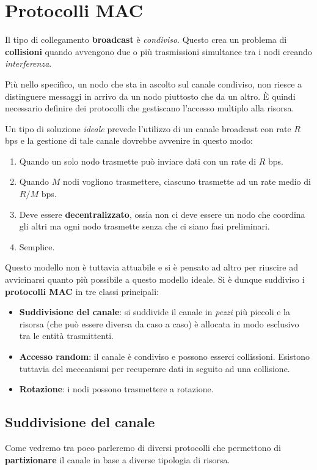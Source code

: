 \section{Protocolli MAC}
Il tipo di collegamento \textbf{broadcast} è \emph{condiviso}. Questo
crea un problema di \textbf{collisioni} quando avvengono due o più 
trasmissioni simultanee tra i nodi creando \emph{interferenza}.

Più nello specifico, un nodo che sta in ascolto sul canale condiviso,
non riesce a distinguere messaggi in arrivo da un nodo piuttosto che
da un altro. \`E quindi necessario definire dei protocolli che 
gestiscano l'accesso multiplo alla risorsa.

Un tipo di soluzione \emph{ideale} prevede l'utilizzo di un canale 
broadcast con rate $R$ bps e la gestione di tale canale dovrebbe 
avvenire in questo modo:
\begin{enumerate}
	\item Quando un solo nodo trasmette può inviare dati con un rate 
		di $R$ bps.
	\item Quando $M$ nodi vogliono trasmettere, ciascuno trasmette ad
		un rate medio di $R / M$ bps.
	\item Deve essere \textbf{decentralizzato}, ossia non ci deve
		essere un nodo che coordina gli altri ma ogni nodo trasmette
		senza che ci siano fasi preliminari.
	\item Semplice.
\end{enumerate}
Questo modello non è tuttavia attuabile e si è pensato ad altro per
riuscire ad avvicinarsi quanto più possibile a questo modello ideale.
Si è dunque suddiviso i \textbf{protocolli MAC} in tre classi 
principali:
\begin{itemize}
	\item \textbf{Suddivisione del canale}: si suddivide il canale
		in \emph{pezzi} più piccoli e la risorsa (che può essere 
		diversa da caso a caso) è allocata in modo esclusivo tra le
		entità trasmittenti.
	\item \textbf{Accesso random}: il canale è condiviso e possono 
		esserci collissioni. Esistono tuttavia del meccanismi per
		recuperare dati in seguito ad una collisione.
	\item \textbf{Rotazione}: i nodi possono trasmettere a rotazione.
\end{itemize}

\subsection{Suddivisione del canale}
Come vedremo tra poco parleremo di diversi protocolli che permettono
di \textbf{partizionare} il canale in base a diverse tipologia di
risorsa.

